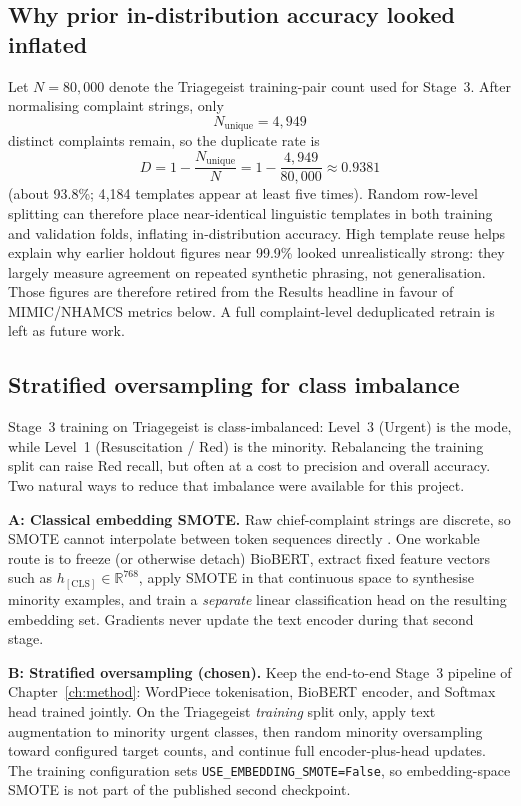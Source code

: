 \subsection{Why prior in-distribution accuracy looked inflated}
\label{sec:high-accuracy}

Let \(N=80{,}000\) denote the Triagegeist training-pair count used for Stage~3. After normalising complaint strings, only
\[
  N_{\mathrm{unique}}=4{,}949
\]
distinct complaints remain, so the duplicate rate is
\[
  D=1-\frac{N_{\mathrm{unique}}}{N}=1-\frac{4{,}949}{80{,}000}\approx 0.9381
\]
(about 93.8\%; 4{,}184 templates appear at least five times). Random row-level splitting can therefore place near-identical linguistic templates in both training and validation folds, inflating in-distribution accuracy. High template reuse helps explain why earlier holdout figures near 99.9\% looked unrealistically strong: they largely measure agreement on repeated synthetic phrasing, not generalisation. Those figures are therefore retired from the Results headline in favour of MIMIC/NHAMCS metrics below. A full complaint-level deduplicated retrain is left as future work.

\subsection{Stratified oversampling for class imbalance}
\label{sec:oversampling-choice}

Stage~3 training on Triagegeist is class-imbalanced: Level~3 (Urgent) is the mode, while Level~1 (Resuscitation / Red) is the minority. Rebalancing the training split can raise Red recall, but often at a cost to precision and overall accuracy. Two natural ways to reduce that imbalance were available for this project.

\textbf{A: Classical embedding SMOTE.} Raw chief-complaint strings are discrete, so SMOTE cannot interpolate between token sequences directly \citep{chawla2002smote}. One workable route is to freeze (or otherwise detach) BioBERT, extract fixed feature vectors such as \(h_{[\mathrm{CLS}]}\in\mathbb{R}^{768}\), apply SMOTE in that continuous space to synthesise minority examples, and train a \emph{separate} linear classification head on the resulting embedding set. Gradients never update the text encoder during that second stage.

\textbf{B: Stratified oversampling (chosen).} Keep the end-to-end Stage~3 pipeline of Chapter~\ref{ch:method}: WordPiece tokenisation, BioBERT encoder, and Softmax head trained jointly. On the Triagegeist \emph{training} split only, apply text augmentation to minority urgent classes, then random minority oversampling toward configured target counts, and continue full encoder-plus-head updates. The training configuration sets \texttt{USE\_EMBEDDING\_SMOTE=False}, so embedding-space SMOTE is not part of the published second checkpoint.

